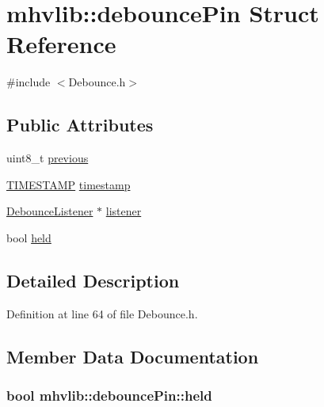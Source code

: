 \hypertarget{structmhvlib_1_1debounce_pin}{\section{mhvlib\-:\-:debounce\-Pin Struct Reference}
\label{structmhvlib_1_1debounce_pin}
}


{\ttfamily \#include $<$Debounce.\-h$>$}

\subsection*{Public Attributes}
\begin{DoxyCompactItemize}
\item 
uint8\-\_\-t \hyperlink{structmhvlib_1_1debounce_pin_a110f46df535f0eeb71c094249d2b7944}{previous}
\item 
\hyperlink{namespacemhvlib_ae0658d1591e8aabca3a4b259a0c483cd}{T\-I\-M\-E\-S\-T\-A\-M\-P} \hyperlink{structmhvlib_1_1debounce_pin_a95ae59250967a55e876b699132cccc66}{timestamp}
\item 
\hyperlink{classmhvlib_1_1_debounce_listener}{Debounce\-Listener} $\ast$ \hyperlink{structmhvlib_1_1debounce_pin_a38dec23701c6f1f81f9cb96b84b19531}{listener}
\item 
bool \hyperlink{structmhvlib_1_1debounce_pin_ae298469080070ae7ea804d2edd121d8a}{held}
\end{DoxyCompactItemize}


\subsection{Detailed Description}


Definition at line 64 of file Debounce.\-h.



\subsection{Member Data Documentation}
\hypertarget{structmhvlib_1_1debounce_pin_ae298469080070ae7ea804d2edd121d8a}{
\subsubsection[{held}]{\setlength{\rightskip}{0pt plus 5cm}bool mhvlib\-::debounce\-Pin\-::held}}\label{structmhvlib_1_1debounce_pin_ae298469080070ae7ea804d2edd121d8a}


